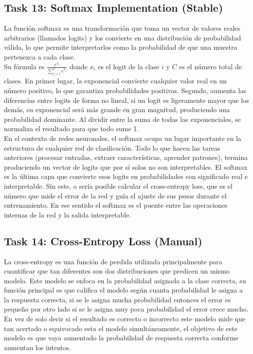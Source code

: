 \documentclass[12pt]{article}
\begin{document}
\subsection*{Task 13: Softmax Implementation (Stable)}
La función softmax es una transformación que toma un vector de valores reales
arbitrarios (llamados logits) y los convierte en una distribución de probabilidad 
válida, lo que permite interpretarlos como la probabilidad de que una muestra 
pertenezca a cada clase.\\
Su fórmula es $\displaystyle \frac{e^{x_i}}{\sum_{j=i}^{C} e^{x_j}}$ donde $x_i$ es el 
logit de la clase $i$ y $C$ es el número total de clases. En primer lugar, la exponencial convierte cualquier
valor real en un número positivo, lo que garantiza probabilidades positivas. 
Segundo, aumenta las diferencias entre logits de forma no lineal, si un logit es ligeramente mayor que los demás,
su exponencial será más grande en gran magnitud, produciendo una probabilidad dominante. Al dividir entre la suma
de todas las exponenciales, se normaliza el resultado para que todo sume 1.\\
En el contexto de redes neuronales, el softmax ocupa un lugar importante en la estructura de cualquier red de clasificación.
Todo lo que hacen las tareas anteriores (procesar entradas, extraer características, aprender patrones), termina produciendo
un vector de logits que por sí solos no son interpretables. El softmax es la última capa que convierte esos logits en probabilidades
con significado real e interpretable. Sin este, o sería posible calcular el cross-entropy loss, que es el número que mide el error de
la red y guía el ajuste de sus pesos durante el entrenamiento. En ese sentido el softmax es el puente entre las operaciones internas de 
la red y la salida interpretable.
\subsection*{Task 14: Cross-Entropy Loss (Manual)}
La cross-entropy es una función de perdida utilizada principalmente para cuantificar que tan diferentes son dos distribuciones que predicen un mismo modelo.
Este modelo se enfoca en la probabilidad asignada a la clase correcta, su función principal es que califica el modelo según cuanta probabilidad le asigna a la respuesta correcta, si se le asigna mucha probabilidad entonces el error es pequeño por otro lado si se le asigna muy poca probabilidad el error crece mucho. En vez de solo decir si el resultado es correcto o incorrecto este modelo mide que tan acertado o equivocado esta el modelo simultáneamente, el objetivo de este modelo es que vaya aumentado la probabilidad de respuesta correcta conforme aumentan los intentos.
\end{document}
